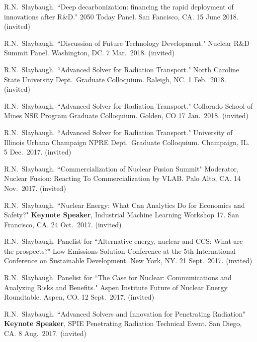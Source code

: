\begin{bibsection}
\item R.N.\ Slaybaugh.  ``Deep decarbonization: financing the rapid deployment of innovations after R\&D." 2050 Today Panel. San Fancisco, CA. 15 June 2018. (invited)

\item R.N.\ Slaybaugh. ``Discussion of Future Technology Development." Nuclear R\&D Summit Panel. Washington, DC. 7 Mar.\ 2018. (invited)

\item R.N.\ Slaybaugh.  ``Advanced Solver for Radiation Transport." North Caroline State University Dept.\ Graduate Colloquium. Raleigh, NC. 1 Feb.\ 2018. (invited)

\item R.N.\ Slaybaugh.  ``Advanced Solver for Radiation Transport." Collorado School of Mines NSE Program Graduate Colloquium. Golden, CO 17 Jan.\ 2018. (invited)

\item R.N.\ Slaybaugh.  ``Advanced Solver for Radiation Transport." University of Illinois Urbana Champaign NPRE Dept.\ Graduate Colloquium. Champaign, IL. 5 Dec.\ 2017. (invited)

\item R.N.\ Slaybaugh. ``Commercialization of  Nuclear Fusion Summit" Moderator, Nuclear Fusion: Reacting To Commercialization by VLAB. Palo Alto, CA. 14 Nov.\ 2017. (invited)

\item R.N.\ Slaybaugh. ``Nuclear Energy: What Can Analytics Do for Economics and Safety?" \textbf{Keynote Speaker}, Industrial Machine Learning Workshop 17. San Francisco, CA. 24 Oct.\ 2017. (invited)

\item R.N.\ Slaybaugh. Panelist for ``Alternative energy, nuclear and CCS: What are the prospects?" Low-Emissions Solution Conference at the 5th International Conference on Sustainable Development. New York, NY. 21  Sept.\ 2017. (invited)

\item R.N.\ Slaybaugh. Panelist for ``The Case for Nuclear: Communications and Analyzing Risks and Benefits." Aspen Institute Future of Nuclear Energy Roundtable. Aspen, CO. 12  Sept.\ 2017. (invited)

\item R.N.\ Slaybaugh. ``Advanced Solvers and Innovation for Penetrating Radiation" \textbf{Keynote Speaker}, SPIE Penetrating Radiation Technical Event. San Diego, CA. 8 Aug.\ 2017. (invited)


\end{bibsection}
